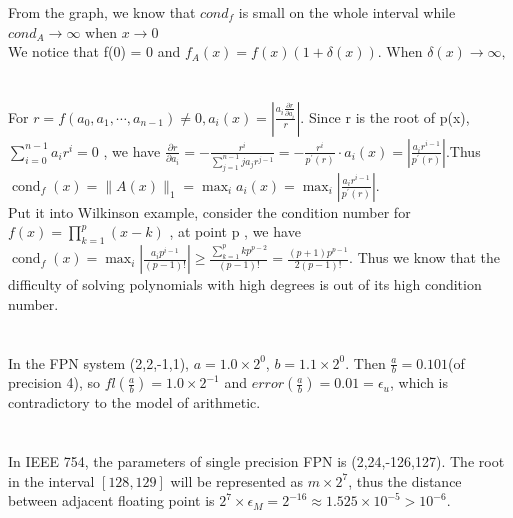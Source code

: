 \documentclass[UTF8]{ctexart}
\begin{document}
\noindent From the graph, we know that $cond_f$ is small on the whole interval while $cond_A \rightarrow \infty \text{ when } x \rightarrow 0$\\
We notice that f(0) = 0 and $f_{A}(x)=f(x)(1+\delta(x))$. When $\delta (x) \rightarrow \infty , $

\section{}
For $r=f\left(a_{0}, a_{1}, \cdots, a_{n-1}\right) \neq 0, a_{i}(x)=\left|\frac{a_{i} \frac{\partial r}{\partial a_{i}}}{r}\right| .$ Since  r  is the root of  p(x), $\sum_{i=0}^{n-1} a_{i} r^{i}=0$ , we have  $\frac{\partial r}{\partial a_{i}}=-\frac{r^{i}}{\sum_{j=1}^{n-1} j a_{j} r^{j-1}}=-\frac{r^{i}}{p^{\prime}(r)} \cdot a_{i}(x)=\left|\frac{a_{i} r^{i-1}}{p^{\prime}(r)}\right| .$Thus
$\operatorname{cond}_{f}(x)=\|A(x)\|_{1}=\max _{i} a_{i}(x)=\max _{i}\left|\frac{a_{i} r^{i-1}}{p^{\prime}(r)}\right| .$\\
\indent  Put it into Wilkinson example, consider the condition number for  $f(x)=\prod_{k=1}^{p}(x-k)$ , at point  p , we have $\operatorname{cond}_{f}(x)=\max _{i}\left|\frac{a_{i} p^{i-1}}{(p-1) !}\right| \geq \frac{\sum_{k=1}^{p} k p^{p-2}}{(p-1) !}=\frac{(p+1) p^{p-1}}{2(p-1) !} $. Thus we know that the difficulty of solving polynomials with high degrees is out of its high condition number.

\section{}
In the FPN system (2,2,-1,1), $a = 1.0 \times 2^0$, $b = 1.1 \times 2^0$. Then $\frac{a}{b} = 0.101 $(of precision 4), so $fl(\frac{a}{b}) = 1.0 \times 2^{-1}$ and $error(\frac{a}{b}) = 0.01 = \epsilon_u$, which is contradictory to the model of arithmetic.

\section{}
In IEEE 754, the parameters of single precision FPN is (2,24,-126,127). The root in the interval $[128,129]$ will be represented as $m \times 2^7$, thus the distance between adjacent floating point is $2^7 \times \epsilon_M = 2^{-16} \approx 1.525 \times 10^{-5} > 10 ^{-6}.$
\end{document}
